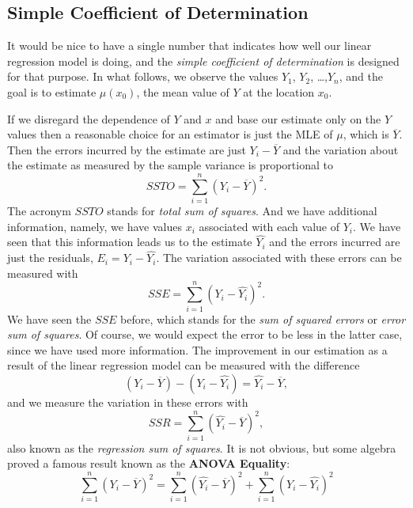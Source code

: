 \documentclass[captions=tableheading]{scrbook}
\begin{document}
\subsection{Simple Coefficient of Determination}
\label{sec-1-3-2}


It would be nice to have a single number that indicates how well our linear regression model is doing, and the \emph{simple coefficient of determination} is designed for that purpose. In what follows, we observe the values \(Y_{1}\), \(Y_{2}\), \ldots{},\(Y_{n}\), and the goal is to estimate \(\mu(x_{0})\), the mean value of \(Y\) at the location \(x_{0}\). 

If we disregard the dependence of \(Y\) and \(x\) and base our estimate only on the \(Y\) values then a reasonable choice for an estimator is just the MLE of \(\mu\), which is \(\overline{Y}\). Then the errors incurred by the estimate are just \(Y_{i}-\overline{Y}\) and the variation about the estimate as measured by the sample variance is proportional to
\begin{equation}
SSTO=\sum_{i=1}^{n}(Y_{i}-\overline{Y})^{2}.
\end{equation}
The acronym \(SSTO\) stands for \emph{total sum of squares}.  And we have additional information, namely, we have values \(x_{i}\) associated with each value of \(Y_{i}\). We have seen that this information leads us to the estimate \(\hat{Y_{i}}\) and the errors incurred are just the residuals, \(E_{i}=Y_{i}-\hat{Y_{i}}\). The variation associated with these errors can be measured with 
\begin{equation}
SSE=\sum_{i=1}^{n}(Y_{i}-\hat{Y_{i}})^{2}.
\end{equation}
We have seen the \(SSE\) before, which stands for the \emph{sum of squared errors} or \emph{error sum of squares}. Of course, we would expect the error to be less in the latter case, since we have used more information. The improvement in our estimation as a result of the linear regression model can be measured with the difference
\[
(Y_{i}-\overline{Y})-(Y_{i}-\hat{Y_{i}})=\hat{Y_{i}}-\overline{Y},
\]
and we measure the variation in these errors with
\begin{equation}
SSR=\sum_{i=1}^{n}(\hat{Y_{i}}-\overline{Y})^{2},
\end{equation}
also known as the \emph{regression sum of squares}. It is not obvious, but some algebra proved a famous result known as the \textbf{ANOVA Equality}:
\begin{equation}
\sum_{i=1}^{n}(Y_{i}-\overline{Y})^{2}=\sum_{i=1}^{n}(\hat{Y_{i}}-\overline{Y})^{2}+\sum_{i=1}^{n}(Y_{i}-\hat{Y_{i}})^{2}\label{eq:anovaeq}
\end{equation}
\end{document}

